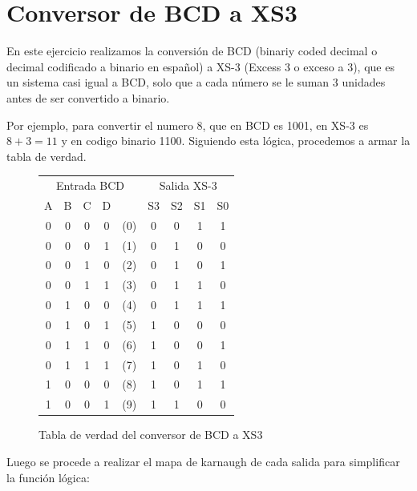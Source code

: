\documentclass[]{informeutn}
\begin{document}
  \maketitle

  \tableofcontents
  \setcounter{page}{1}
  \thispagestyle{plain}


  \chapter{Conversor de BCD a XS3}
    En este ejercicio realizamos la conversión de BCD (binariy coded decimal o decimal codificado a binario en español)
    a XS-3 (Excess 3 o exceso a 3), que es un sistema casi igual a BCD, solo que a cada número se le suman 3 unidades
    antes de ser convertido a binario.

    Por ejemplo, para convertir el numero 8, que en BCD es 1001, en XS-3 es $8+3=11$ y en codigo binario 1100. 
    Siguiendo esta lógica, procedemos a armar la tabla de verdad.
    \begin{figure}[!ht]
      \centering
      \begin{tabular}{|c|c|c|c|c||c|c|c|c|}
      \hline
      \multicolumn{5}{|c||}{Entrada BCD} & \multicolumn{4}{c|}{Salida XS-3} \\
      A & B & C & D & & S3 & S2 & S1 & S0 \\
      \hline
      0 & 0 & 0 & 0 & (0) & 0 & 0 & 1 & 1 \\
      0 & 0 & 0 & 1 & (1) & 0 & 1 & 0 & 0 \\
      0 & 0 & 1 & 0 & (2) & 0 & 1 & 0 & 1 \\
      0 & 0 & 1 & 1 & (3) & 0 & 1 & 1 & 0 \\
      0 & 1 & 0 & 0 & (4) & 0 & 1 & 1 & 1 \\
      0 & 1 & 0 & 1 & (5) & 1 & 0 & 0 & 0 \\
      0 & 1 & 1 & 0 & (6) & 1 & 0 & 0 & 1 \\
      0 & 1 & 1 & 1 & (7) & 1 & 0 & 1 & 0 \\
      1 & 0 & 0 & 0 & (8) & 1 & 0 & 1 & 1 \\
      1 & 0 & 0 & 1 & (9) & 1 & 1 & 0 & 0 \\
      \hline
      \end{tabular}
      \caption{Tabla de verdad del conversor de BCD a XS3}
    \end{figure}

    Luego se procede a realizar el mapa de karnaugh de cada salida para simplificar la función lógica:
\end{document}
